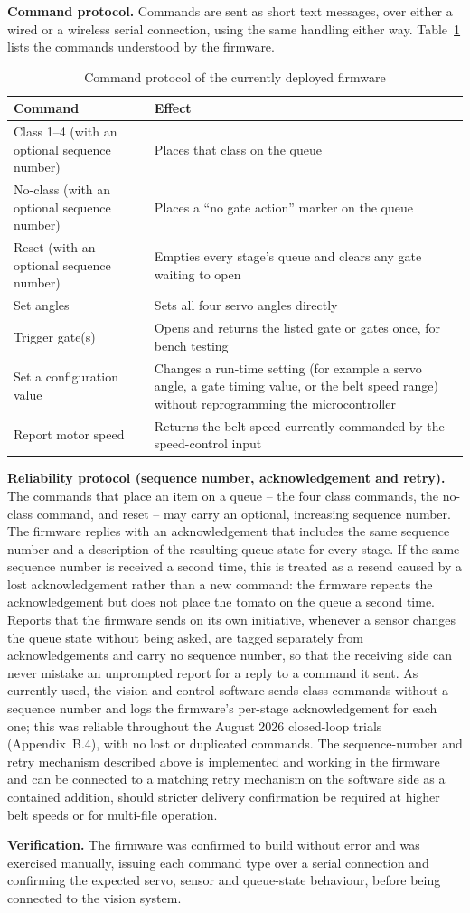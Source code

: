 \textbf{Command protocol.} Commands are sent as short text messages, over either a wired or a wireless serial connection, using the same handling either way. Table~\ref{tab:appendixC_protocol} lists the commands understood by the firmware.

\begin{table}[H]
\caption{Command protocol of the currently deployed firmware}
\label{tab:appendixC_protocol}
\centering
\begin{tabularx}{\textwidth}{l X}
\toprule
\textbf{Command} & \textbf{Effect} \\
\midrule
Class 1--4 (with an optional sequence number) & Places that class on the queue \\
No-class (with an optional sequence number) & Places a ``no gate action'' marker on the queue \\
Reset (with an optional sequence number) & Empties every stage's queue and clears any gate waiting to open \\
Set angles & Sets all four servo angles directly \\
Trigger gate(s) & Opens and returns the listed gate or gates once, for bench testing \\
Set a configuration value & Changes a run-time setting (for example a servo angle, a gate timing value, or the belt speed range) without reprogramming the microcontroller \\
Report motor speed & Returns the belt speed currently commanded by the speed-control input \\
\bottomrule
\end{tabularx}
\end{table}

\textbf{Reliability protocol (sequence number, acknowledgement and retry).} The commands that place an item on a queue -- the four class commands, the no-class command, and reset -- may carry an optional, increasing sequence number. The firmware replies with an acknowledgement that includes the same sequence number and a description of the resulting queue state for every stage. If the same sequence number is received a second time, this is treated as a resend caused by a lost acknowledgement rather than a new command: the firmware repeats the acknowledgement but does not place the tomato on the queue a second time. Reports that the firmware sends on its own initiative, whenever a sensor changes the queue state without being asked, are tagged separately from acknowledgements and carry no sequence number, so that the receiving side can never mistake an unprompted report for a reply to a command it sent. As currently used, the vision and control software sends class commands without a sequence number and logs the firmware's per-stage acknowledgement for each one; this was reliable throughout the August 2026 closed-loop trials (Appendix~B.4), with no lost or duplicated commands. The sequence-number and retry mechanism described above is implemented and working in the firmware and can be connected to a matching retry mechanism on the software side as a contained addition, should stricter delivery confirmation be required at higher belt speeds or for multi-file operation.

\textbf{Verification.} The firmware was confirmed to build without error and was exercised manually, issuing each command type over a serial connection and confirming the expected servo, sensor and queue-state behaviour, before being connected to the vision system.

\clearpage
